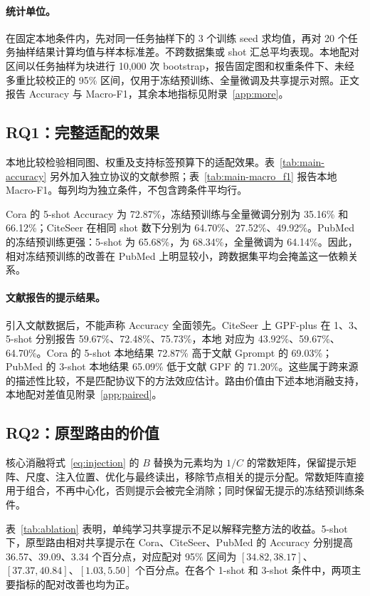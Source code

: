 \paragraph{统计单位。}
在固定本地条件内，先对同一任务抽样下的 3 个训练 seed 求均值，再对 20 个任务抽样结果计算均值与样本标准差。不跨数据集或 shot 汇总平均表现。本地配对区间以任务抽样为块进行 10,000 次 bootstrap，报告固定图和权重条件下、未经多重比较校正的 95\% 区间，仅用于冻结预训练、全量微调及共享提示对照。正文报告 Accuracy 与 Macro-F1，其余本地指标见附录~\ref{app:more}。

\subsection{RQ1：完整适配的效果}
本地比较检验相同图、权重及支持标签预算下的适配效果。表~\ref{tab:main-accuracy} 另外加入独立协议的文献参照；表~\ref{tab:main-macro_f1} 报告本地 Macro-F1。每列均为独立条件，不包含跨条件平均行。

Cora 的 5-shot Accuracy 为 72.87\%，冻结预训练与全量微调分别为 35.16\% 和 66.12\%；CiteSeer 在相同 shot 数下分别为 64.70\%、27.52\%、49.92\%。PubMed 的冻结预训练更强：5-shot 为 65.68\%，\method 为 68.34\%，全量微调为 64.14\%。因此，相对冻结预训练的改善在 PubMed 上明显较小，跨数据集平均会掩盖这一依赖关系。

\paragraph{文献报告的提示结果。}
引入文献数据后，不能声称 Accuracy 全面领先。CiteSeer 上 GPF-plus 在 1、3、5-shot 分别报告 59.67\%、72.48\%、75.73\%，本地 \method 对应为 43.92\%、59.67\%、64.70\%。Cora 的 5-shot 本地结果 72.87\% 高于文献 Gprompt 的 69.03\%；PubMed 的 3-shot 本地结果 65.09\% 低于文献 GPF 的 71.20\%。这些属于跨来源的描述性比较，不是匹配协议下的方法效应估计。路由价值由下述本地消融支持，本地配对差值见附录~\ref{app:paired}。

\subsection{RQ2：原型路由的价值}
核心消融将式~\eqref{eq:injection} 的 $B$ 替换为元素均为 $1/C$ 的常数矩阵，保留提示矩阵、尺度、注入位置、优化与最终读出，移除节点相关的提示分配。常数矩阵直接用于组合，不再中心化，否则提示会被完全消除；同时保留无提示的冻结预训练条件。

表~\ref{tab:ablation} 表明，单纯学习共享提示不足以解释完整方法的收益。5-shot 下，原型路由相对共享提示在 Cora、CiteSeer、PubMed 的 Accuracy 分别提高 36.57、39.09、3.34 个百分点，对应配对 95\% 区间为 $[34.82,38.17]$、$[37.37,40.84]$、$[1.03,5.50]$ 个百分点。在各个 1-shot 和 3-shot 条件中，两项主要指标的配对改善也均为正。

